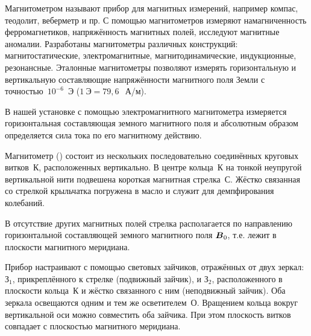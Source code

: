 


Магнитометром называют прибор для магнитных измерений, например компас, теодолит, веберметр и пр. С помощью
магнитометров измеряют намагниченность ферромагнетиков, напряжённость магнитных полей, исследуют магнитные аномалии.
Разработаны магнитометры различных конструкций: магнитостатические, электромагнитные, магнитодинамические, индукционные,
резонансные. Эталонные магнитометры позволяют измерять горизонтальную и вертикальную составляющие напряжённости
магнитного поля Земли с точностью~$10^{-6}$~Э ($1~Э=79,6~$~А/м).


В нашей установке с помощью электромагнитного магнитометра измеряется горизонтальная составляющая земного магнитного
поля и абсолютным образом определяется сила тока по его магнитному действию.

\eo\break Магнитометр () состоит из нескольких последовательно соединённых круговых витков~К, расположенных
вертикально. В центре кольца~К на тонкой неупругой вертикальной нити подвешена короткая магнитная стрелка~С. Жёстко
связанная со стрелкой крыльчатка погружена в масло и служит для демпфирования колебаний.

В отсутствие других магнитных полей стрелка располагается по направлению горизонтальной составляющей земного магнитного
поля $\v{B}_0$, т.е. лежит в плоскости магнитного меридиана.

Прибор настраивают с помощью световых зайчиков, отражённых от двух зеркал: $З_1$, прикреплённого к стрелке (подвижный
зайчик), и $З_2$, расположенного в плоскости кольца~К и жёстко связанного с ним (неподвижный зайчик). Оба зеркала
освещаются одним и тем же осветителем~О. Вращением кольца вокруг вертикальной оси можно совместить оба зайчика. При этом
плоскость витков совпадает с плоскостью магнитного меридиана.


